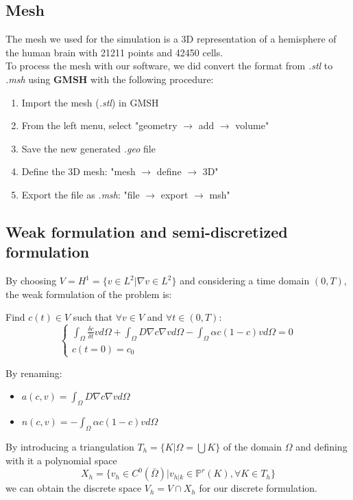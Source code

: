 \documentclass[12pt, letterpaper]{article}
\begin{document}
\subsection{Mesh}
The mesh we used for the simulation is a 3D representation of a hemisphere of the human brain with 21211 points and 42450 cells.\\
To process the mesh with our software, we did convert the format from \textit{.stl} to \textit{.msh} using \textbf{GMSH} with the following procedure:
\begin{enumerate}
    \item Import the mesh (\textit{.stl}) in GMSH
    \item From the left menu, select "geometry $\rightarrow$ add $\rightarrow$ volume"
    \item Save the new generated \textit{.geo} file
    \item Define the 3D mesh: "mesh $\rightarrow$ define $\rightarrow$ 3D"
    \item Export the file as \textit{.msh}: "file $\rightarrow$ export $\rightarrow$ msh"
\end{enumerate}


\subsection{Weak formulation and semi-discretized formulation}
By choosing $V=H^1=\{v\in L^2|\nabla v\in L^2\}$ and considering a time domain $(0, T)$, the weak formulation of the problem is:

\vspace{1em}
\noindent Find $c(t)\in V$ such that $\forall v\in V$ and $\forall t\in(0,T)$:
$$\begin{cases}\int_\Omega\frac{\delta c}{\delta t}vd\Omega+\int_\Omega D\nabla c\nabla vd\Omega-\int_\Omega\alpha c(1-c)vd\Omega=0\\c(t=0)=c_0\end{cases}$$

\vspace{1em}
\noindent By renaming:
\begin{itemize}
    \item $a(c,v)=\int_\Omega D\nabla c\nabla vd\Omega$
    \item $n(c,v)=-\int_\Omega\alpha c(1-c)vd\Omega$
\end{itemize}

\noindent By introducing a triangulation $T_h=\{K|\Omega=\bigcup K\}$ of the domain $\Omega$ and defining with it a polynomial space $$X_h=\{v_h\in C^0(\bar\Omega)|v_{h|k}\in\mathbb{P}^r(K),\forall K\in T_h\}$$ we can obtain the discrete space $V_h=V\cap X_h$ for our discrete formulation.
\end{document}
